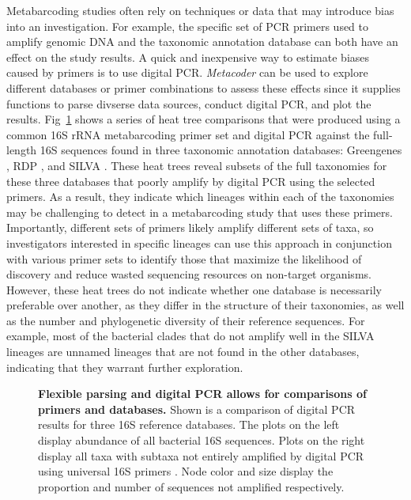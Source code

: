 \documentclass[10pt,letterpaper]{article}
\begin{document}
Metabarcoding studies often rely on techniques or data that may
introduce bias into an investigation. For example, the specific set of
PCR primers used to amplify genomic DNA and the taxonomic annotation
database can both have an effect on the study results. A quick and
inexpensive way to estimate biases caused by primers is to use digital
PCR. \emph{Metacoder} can be used to explore different databases or
primer combinations to assess these effects since it supplies functions
to parse divserse data sources, conduct digital PCR, and plot the
results. Fig~\ref{fig4} shows a series of heat tree comparisons that were
produced using a common 16S rRNA metabarcoding primer set and digital
PCR against the full-length 16S sequences found in three taxonomic
annotation databases: Greengenes \cite{desantis2006greengenes}, RDP
\cite{maidak1996ribosomal}, and SILVA \cite{quast2013silva}. These heat
trees reveal subsets of the full taxonomies for these three databases
that poorly amplify by digital PCR using the selected primers. As a
result, they indicate which lineages within each of the taxonomies may
be challenging to detect in a metabarcoding study that uses these
primers. Importantly, different sets of primers likely amplify different
sets of taxa, so investigators interested in specific lineages can use
this approach in conjunction with various primer sets to identify those
that maximize the likelihood of discovery and reduce wasted sequencing
resources on non-target organisms. However, these heat trees do not
indicate whether one database is necessarily preferable over another, as
they differ in the structure of their taxonomies, as well as the number
and phylogenetic diversity of their reference sequences. For example,
most of the bacterial clades that do not amplify well in the SILVA
lineages are unnamed lineages that are not found in the other databases,
indicating that they warrant further exploration.

\begin{figure}[!h]
\caption{{\bf Flexible parsing and digital PCR allows for comparisons
		of primers and databases.}
Shown is a comparison of digital PCR results
for three 16S reference databases. The plots on the left display
abundance of all bacterial 16S sequences. Plots on the right display all
taxa with subtaxa not entirely amplified by digital PCR using universal
16S primers \cite{walters2016improved}. Node color and size display the
proportion and number of sequences not amplified respectively.}
\label{fig4}
\end{figure}
\end{document}
